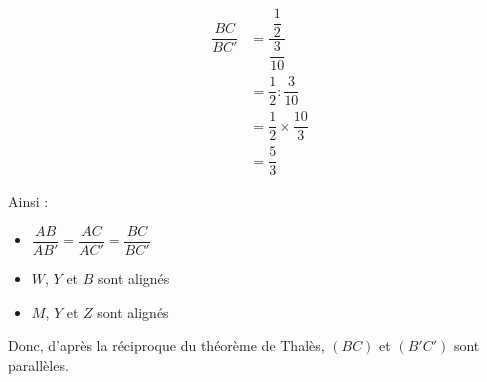 \begin{multicols}{2}
\begin{multicols}{3}
        \begin{align*}
            \dfrac{BC}{BC'}&=\dfrac{\dfrac{1}{2}}{\dfrac{3}{10}}\\
            &=\dfrac{1}{2}:\dfrac{3}{10}\\
            &=\dfrac{1}{2}\times\dfrac{10}{3}\\
            &=\dfrac{5}{3}
        \end{align*}
    \end{multicols}
    \vspace{-1.75em }
    Ainsi :
    \begin{itemize}
        \item $\dfrac{AB}{AB'}=\dfrac{AC}{AC'}=\dfrac{BC}{BC'}$\vspace{0.25em}
        \item $W$, $Y$ et $B$ sont alignés
        \item $M$, $Y$ et $Z$ sont alignés
    \end{itemize}
    Donc, d'après la réciproque du théorème de Thalès, $(BC)$ et $(B'C')$ sont parallèles.
  \end{multicols}

\newpage
\exo{}{}

